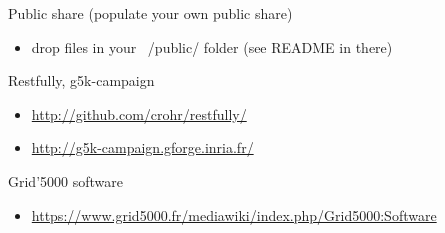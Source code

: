 Public share (populate your own public share)
\begin{itemize}
\item drop files in your ~/public/ folder (see README in there)
\end{itemize}

Restfully, g5k-campaign
\begin{itemize}
\item \url{http://github.com/crohr/restfully/}
\item \url{http://g5k-campaign.gforge.inria.fr/}
\end{itemize}

Grid'5000 software
\begin{itemize}
\item \url{https://www.grid5000.fr/mediawiki/index.php/Grid5000:Software}
\end{itemize}